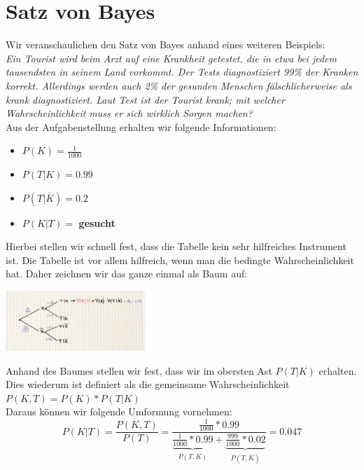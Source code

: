 \documentclass[a4paper]{article}
\newenvironment{Figure}
	{\par\medskip\noindent\minipage{\linewidth}}
	{\endminipage\par\medskip}
\theoremstyle{definition}
\theoremstyle{example}
\begin{document}
\section{Satz von Bayes}
Wir veranschaulichen den Satz von Bayes anhand eines weiteren Beispiels:\\
\textit{Ein Tourist wird beim Arzt auf eine Krankheit getestet, die in etwa bei jedem tausendsten in seinem Land vorkommt. Der Tests diagnostiziert 99\% der Kranken korrekt. Allerdings werden auch 2\% der gesunden Menschen fälschlicherweise als krank diagnostiziert. Laut Test ist der Tourist krank; mit welcher Wahrscheinlichkeit muss er sich wirklich Sorgen machen?}\\
Aus der Aufgabenstellung erhalten wir folgende Informationen:\\
\begin{itemize}
	\item $P(K) = \frac{1}{1000}$
	\item $P(T|K) = 0.99$
	\item $P(T|\bar{K}) = 0.2$
	\item $P(K|T) =$ \textbf{gesucht}
\end{itemize}
Hierbei stellen wir schnell fest, dass die Tabelle kein sehr hilfreiches Instrument ist. Die Tabelle ist vor allem hilfreich, wenn man die bedingte Wahrscheinlichkeit hat. Daher zeichnen wir das ganze einmal als Baum auf:\\

\begin{Figure}
\centering
\includegraphics[width=200px]{img/BaumKgegeben.jpg}
	\label{fig:Baum inkl. Wsk wenn K gegeben}
\end{Figure}

Anhand des Baumes stellen wir fest, dass wir im obersten Ast $P(T|K)$ erhalten. Dies wiederum ist definiert als die gemeinsame Wahrscheinlichkeit $P(K,T) = P(K)*P(T|K)$\\
Daraus können wir folgende Umformung vornehmen:\\
\begin{equation}
P(K|T) = \frac{P(K,T)}{P(T)} = \frac{\frac{1}{1000}*0.99}{\underbrace{\frac{1}{1000}*0.99}_{\substack{P(T,K)}}+\underbrace{\frac{999}{1000}*0.02}_{\substack{P(T,\bar{K})}}} = 0.047
\end{equation}
\end{document}
